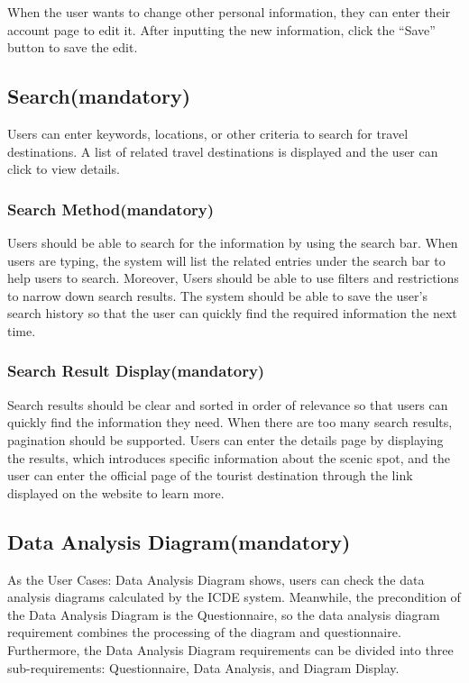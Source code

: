 \documentclass[conference]{IEEEtran}
\begin{document}
When the user wants to change other personal information, they can 
enter their account page to edit it. After inputting the new information, click 
the “Save” button to save the edit.

\subsection{ Search(mandatory) }

Users can enter keywords, locations, or other criteria to search for travel 
destinations.
A list of related travel destinations is displayed and the user can click to view 
details.

\subsubsection{ Search Method(mandatory) }

Users should be able to search for the information by using the search 
bar. When users are typing, the system will list the related entries under the 
search bar to help users to search. Moreover, Users should be able to use 
filters and restrictions to narrow down search results. The system should be 
able to save the user's search history so that the user can quickly find the 
required information the next time.

\subsubsection{ Search Result Display(mandatory) }

Search results should be clear and sorted in order of relevance so that 
users can quickly find the information they need. When there are too many 
search results, pagination should be supported. Users can enter the details 
page by displaying the results, which introduces specific information about 
the scenic spot, and the user can enter the official page of the tourist 
destination through the link displayed on the website to learn more.

\subsection{ Data Analysis Diagram(mandatory) }

As the User Cases: Data Analysis Diagram shows, users can check the 
data analysis diagrams calculated by the ICDE system. Meanwhile, the precondition of the Data Analysis Diagram is the Questionnaire, 
so the data analysis diagram requirement combines the processing of the diagram and questionnaire. Furthermore, the Data Analysis
Diagram requirements can be divided into three sub-requirements: Questionnaire, Data Analysis, and Diagram Display.
\end{document}
